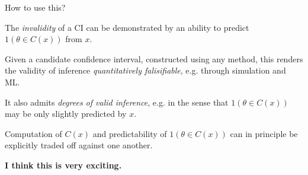 \documentclass[8pt]{beamer}\usepackage[]{graphicx}\usepackage[]{color}
\begin{document}

\begin{frame}{How to use this?}

The {\em invalidity} of a CI can be demonstrated by an ability
to predict $1(\theta \in C(x))$ from $x$.

\pause

Given a candidate confidence interval, constructed using any method, this
renders the validity of inference {\em quantitatively falisifiable}, e.g.
through simulation and ML.

\pause

It also admits {\em degrees of valid inference}, e.g. in the sense that
$1(\theta \in C(x))$ may be only slightly
predicted by $x$.

\pause

Computation of $C(x)$ and predictability of $1(\theta \in C(x))$
can in principle be explicitly traded off against one another.

\pause

\textbf{I think this is very exciting.}

\end{frame}
\end{document}
